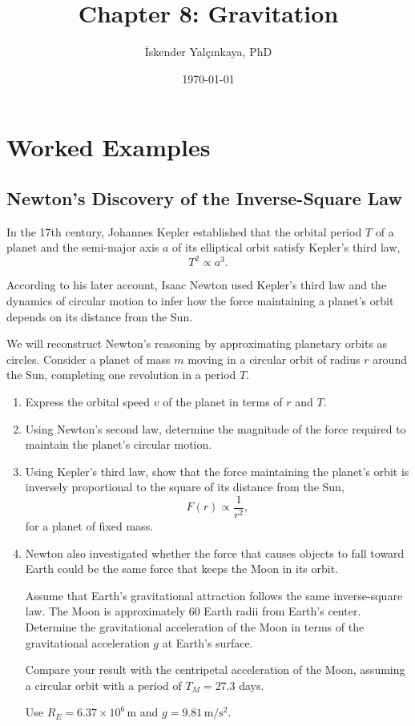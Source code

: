 \documentclass[12pt]{article}
\title{Chapter 8: Gravitation}
\author{İskender Yalçınkaya, PhD}
\date{\today}
\begin{document}
\maketitle




\section{Worked Examples}

\subsection{Newton's Discovery of the Inverse-Square Law}

In the 17th century, Johannes Kepler established that the orbital
period $T$ of a planet and the semi-major axis $a$ of its elliptical
orbit satisfy Kepler's third law,
\begin{equation}
    T^2 \propto a^3.
\end{equation}

According to his later account, Isaac Newton used Kepler's third
law and the dynamics of circular motion to infer how the force
maintaining a planet's orbit depends on its distance from the Sun.

We will reconstruct Newton's reasoning by approximating planetary
orbits as circles. Consider a planet of mass $m$ moving in a circular
orbit of radius $r$ around the Sun, completing one revolution in
a period $T$.

\begin{enumerate}
    \item[(a)] Express the orbital speed $v$ of the planet in terms
    of $r$ and $T$.

    \item[(b)] Using Newton's second law, determine the magnitude
    of the force required to maintain the planet's circular motion.

    \item[(c)] Using Kepler's third law, show that the force
    maintaining the planet's orbit is inversely proportional
    to the square of its distance from the Sun,
    \begin{equation}
        F(r)\propto\frac{1}{r^2},
    \end{equation}
    for a planet of fixed mass.

    \item[(d)] Newton also investigated whether the force that
    causes objects to fall toward Earth could be the same force
    that keeps the Moon in its orbit.

    Assume that Earth's gravitational attraction follows the same
    inverse-square law. The Moon is approximately $60$ Earth radii
    from Earth's center. Determine the gravitational acceleration
    of the Moon in terms of the gravitational acceleration $g$
    at Earth's surface.

    Compare your result with the centripetal acceleration of
    the Moon, assuming a circular orbit with a period of
    $T_M=27.3$ days.

    Use $R_E=6.37\times10^6\,\mathrm{m}$ and
    $g=9.81\,\mathrm{m/s^2}$.
\end{enumerate}
\end{document}
